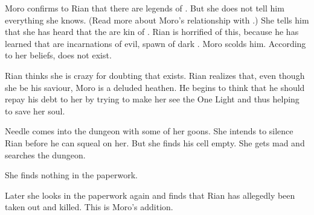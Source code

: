 
Moro confirms to Rian that there are legends of \serpentmen. 
But she does not tell him everything she knows. 
(Read more about Moro's relationship with \quiljaaran.)
She tells him that she has heard that the \serpentmen are kin of \dragons. 
Rian is horrified of this, because he has learned that \dragons are incarnations of evil, spawn of dark \Isphet. 
Moro scolds him. 
According to her beliefs, \Isphet does not exist. 

Rian thinks she is crazy for doubting that \Isphet exists. 
Rian realizes that, even though she be his saviour, Moro is a deluded heathen.
He begins to think that he should repay his debt to her by trying to make her see the One Light and thus helping to save her soul.






\begin{comment}
  \section{Needle looks for Rian}
\end{comment}
\begin{garbage}
Needle comes into the dungeon with some of her goons. 
She intends to silence Rian before he can squeal on her. 
But she finds his cell empty. 
She gets mad and searches the dungeon. 

She finds nothing in the paperwork. 

Later she looks in the paperwork again and finds that Rian has allegedly been taken out and killed. 
This is Moro's addition. 
\end{garbage}










